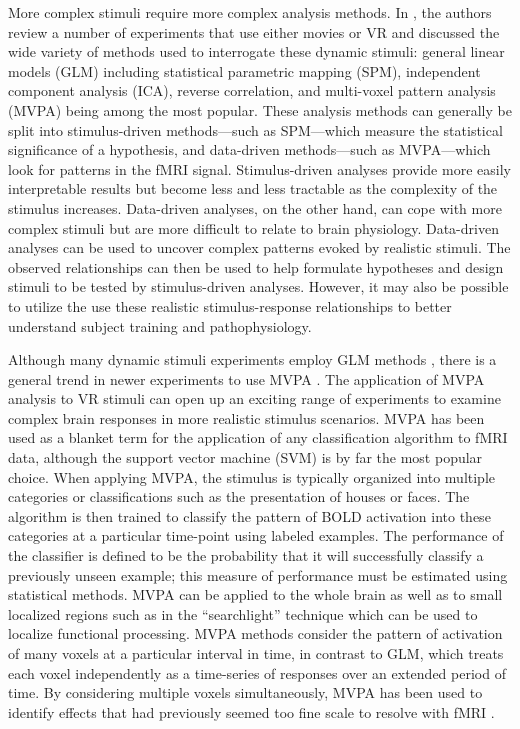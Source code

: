 \documentclass[authoryear]{elsarticle}
\begin{document}
More complex stimuli require more complex analysis methods.
In \cite{Spiers2007}, the authors review a number of experiments that use either movies or VR and discussed the wide variety of methods used to interrogate these dynamic stimuli: general linear models (GLM) including statistical parametric mapping (SPM), independent component analysis (ICA), reverse correlation, and multi-voxel pattern analysis (MVPA) being among the most popular.
These analysis methods can generally be split into stimulus-driven methods---such as SPM---which measure the statistical significance of a hypothesis, and data-driven methods---such as MVPA---which look for patterns in the fMRI signal.
Stimulus-driven analyses provide more easily interpretable results but become less and less tractable as the complexity of the stimulus increases.
Data-driven analyses, on the other hand, can cope with more complex stimuli but are more difficult to relate to brain physiology.
Data-driven analyses can be used to uncover complex patterns evoked by realistic stimuli. The observed relationships can then be used to help formulate hypotheses and design stimuli to be tested by stimulus-driven analyses. However, it may also be possible to utilize the use these realistic stimulus-response relationships to better understand subject training and pathophysiology.

Although many dynamic stimuli experiments employ GLM methods \citep{Maguire1998,Calhoun2002,King2006,Mathiak2006,Spiers2007a}, there is a general trend in newer experiments to use MVPA \citep{Hassabis2009,Chadwick2010,Haxby2001,Mitchell2003,Haynes2006}. The application of MVPA analysis to VR stimuli can open up an exciting range of experiments to examine complex brain responses in more realistic stimulus scenarios.
MVPA has been used as a blanket term for the application of any classification algorithm to fMRI data, although the support vector machine (SVM) is by far the most popular choice.
When applying MVPA, the stimulus is typically organized into multiple categories or classifications such as the presentation of houses or faces.
The algorithm is then trained to classify the pattern of BOLD activation into these categories at a particular time-point using labeled examples.
The performance of the classifier is defined to be the probability that it will successfully classify a previously unseen example;
this measure of performance must be estimated using statistical methods.
MVPA can be applied to the whole brain as well as to small localized regions such as in the ``searchlight'' technique \citep{Kriegeskorte2006} which can be used to localize functional processing.
MVPA methods consider the pattern of activation of many voxels at a particular interval in time, in contrast to GLM, which treats each voxel independently as a time-series of responses over an extended period of time.
By considering multiple voxels simultaneously, MVPA has been used to identify effects that had previously seemed too fine scale to resolve with fMRI \citep{Kamitani2005,Hassabis2009}.
\end{document}
